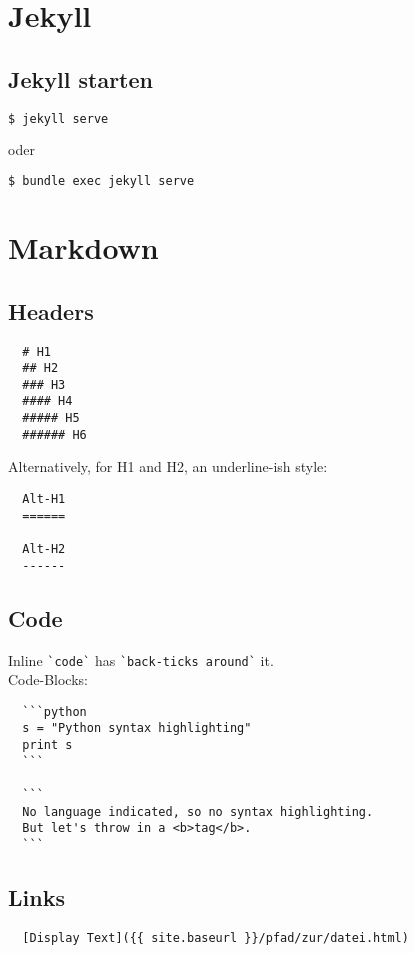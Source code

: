 \documentclass[10pt,landscape,a4paper]{CheatSheet}
\begin{document}
\begin{multicols}{4}
\section{Jekyll}
\subsection{Jekyll starten}
\begin{lstlisting}[language=bash]
$ jekyll serve
\end{lstlisting} %
oder
\begin{lstlisting}[language=bash]
$ bundle exec jekyll serve
\end{lstlisting} %


\section{Markdown}
\subsection{Headers}
\begin{lstlisting}
  # H1
  ## H2
  ### H3
  #### H4
  ##### H5
  ###### H6
\end{lstlisting}  
 Alternatively, for H1 and H2, an underline-ish style:
\begin{lstlisting}
  Alt-H1
  ======
  
  Alt-H2
  ------
\end{lstlisting}
\subsection{Code}
Inline \lstinline{`code`} has \lstinline{`back-ticks around`} it.\\
Code-Blocks:
\begin{lstlisting}
  ```python
  s = "Python syntax highlighting"
  print s
  ```
  
  ```
  No language indicated, so no syntax highlighting. 
  But let's throw in a <b>tag</b>.
  ```
\end{lstlisting}
\subsection{Links}
\begin{lstlisting}
  [Display Text]({{ site.baseurl }}/pfad/zur/datei.html)
\end{lstlisting}
\end{multicols}
\end{document}
